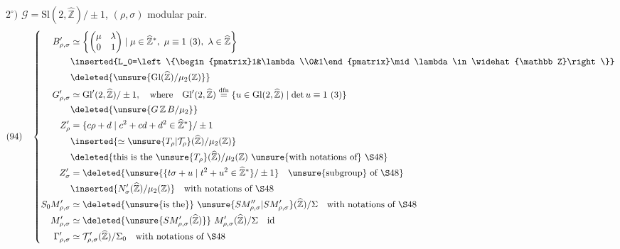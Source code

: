 $2^\circ)$ $\mathcal G=\mathrm{Sl}(2,\widehat{\mathbb Z})/\pm1$, $(\rho,\sigma)$ modular pair.
\[
\begin{aligned}
(94)\quad\left\{\begin{aligned}
B'_{\rho,\sigma}&\simeq
\left\{\begin{pmatrix}\mu&\lambda\\0&1\end{pmatrix}
\mid\mu\in\widehat{\mathbb Z}^{*},\ \mu\equiv1\ (3),\ \lambda\in\widehat{\mathbb Z}\right\}\\
&\inserted{L_0=\left\{\begin{pmatrix}1&\lambda\\0&1\end{pmatrix}\mid\lambda\in\widehat{\mathbb Z}\right\}}\\
&\deleted{\unsure{\mathrm{Gl}(\widehat{\mathbb Z})/\mu_2(\mathbb Z)}}\\
G'_{\rho,\sigma}&\simeq\mathrm{Gl}'(2,\widehat{\mathbb Z})/\pm1,\quad\text{where}\quad
\mathrm{Gl}'(2,\widehat{\mathbb Z})\overset{\mathrm{dfn}}=
\{u\in\mathrm{Gl}(2,\widehat{\mathbb Z})\mid\det u\equiv1\ (3)\}\\
&\deleted{\unsure{G\,\mathbb Z\,B/\mu_2}}\\
Z'_{\rho}&=\{c\rho+d\mid c^2+cd+d^2\in\widehat{\mathbb Z}^{*}\}/\pm1\\
&\inserted{\simeq\unsure{T_\rho|\mathcal T_\rho}(\widehat{\mathbb Z})/\mu_2(\mathbb Z)}\\
&\deleted{\text{this is the}\ \unsure{T_\rho}(\widehat{\mathbb Z})/\mu_2(\mathbb Z)\ \text{\unsure{with notations of} \S48}}\\
Z'_{\sigma}&=\deleted{\unsure{\{t\sigma+u\mid t^2+u^2\in\widehat{\mathbb Z}^{*}\}/\pm1}\quad\text{\unsure{subgroup} of \S48}}\\
&\inserted{N'_{\sigma}(\widehat{\mathbb Z})/\mu_2(\mathbb Z)}\quad\text{with notations of \S48}\\
S_0M'_{\rho,\sigma}&\simeq\deleted{\text{\unsure{is the}}}\
\unsure{SM''_{\rho,\sigma}|SM'_{\rho,\sigma}}(\widehat{\mathbb Z})/\Sigma\quad\text{with notations of \S48}\\
M'_{\rho,\sigma}&\simeq\deleted{\unsure{SM'_{\rho,\sigma}(\widehat{\mathbb Z})}}\
M'_{\rho,\sigma}(\widehat{\mathbb Z})/\Sigma\quad\text{id}\\
\Gamma'_{\rho,\sigma}&\simeq\mathcal T'_{\rho,\sigma}(\widehat{\mathbb Z})/\Sigma_0\quad\text{with notations of \S48}
\end{aligned}\right.
\end{aligned}
\]


